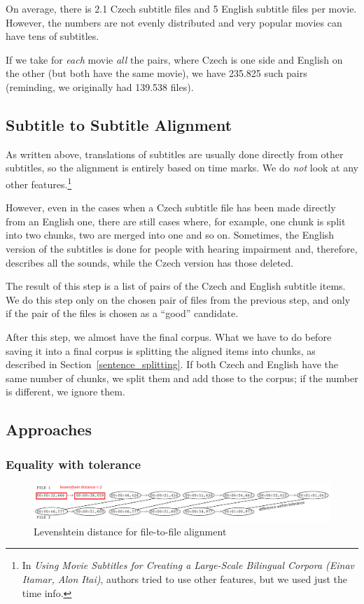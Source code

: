 On average, there is 2.1 Czech subtitle files and 5 English subtitle files per movie. However, the numbers are not evenly distributed and very popular movies can have tens of subtitles.

If we take for \emph{each} movie \emph{all} the pairs, where Czech is one side and English on the other (but both have the same movie), we have 235.825 such pairs (reminding, we originally had 139.538 files).

\subsection{Subtitle to Subtitle Alignment}
As written above, translations of subtitles are usually done directly from other subtitles, so the alignment is entirely based on time marks. We do \emph{not} look at any other features.\footnote{In \emph{Using Movie Subtitles for Creating a Large-Scale Bilingual Corpora (Einav Itamar, Alon Itai)}, authors tried to use other features, but we used just the time info.}

However, even in the cases when a Czech subtitle file has been made directly from an English one, there are still cases where, for example, one chunk is split into two chunks, two are merged into one and so on. Sometimes, the English version of the subtitles is done for people with hearing impairment and, therefore, describes all the sounds, while the Czech version has those deleted.

The result of this step is a list of pairs of the Czech and English subtitle items. We do this step only on the chosen pair of files from the previous step, and only if the pair of the files is chosen as a ``good'' candidate.

After this step, we almost have the final corpus. What we have to do before saving it into a final corpus is splitting the aligned items into chunks, as described in Section~\ref{sentence_splitting}. If both Czech and English have the same number of chunks, we split them and add those to the corpus; if the number is different, we ignore them.


\subsection{Approaches}
\subsubsection{Equality with tolerance}

\begin{figure}[t]
\begin{center}
\includegraphics[width=\textwidth]{figures/tolerance_priklad.pdf}
\end{center}
\caption{Levenshtein distance for file-to-file alignment}\label{tolerance}
\end{figure}

